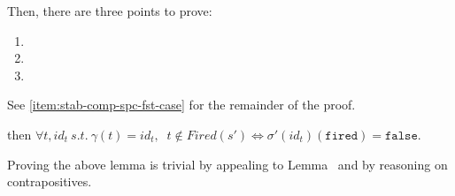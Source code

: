 \documentclass[dvipsnames,12pt]{article}
\begin{document}
\begin{niproof}
\begin{enumerate}
\begin{enumerate}
\begin{enumerate}
        Then, there are three points to prove:
        \begin{enumerate}
        \item {}
        \item {}
        \item
        \end{enumerate}
        
        See \ref{item:stab-comp-spc-fst-case} for the remainder of the
        proof.
        
      \end{enumerate}
      
    \end{enumerate}
  \end{enumerate}
  
\end{niproof}


\begin{lemma}
  \label{lem:fe-equal-not-fired}
  \fehyps{} then $\forall{}t,id_t~s.t.~\gamma(t)=id_t,$
  $~t\notin{}Fired(s')\Leftrightarrow\sigma'(id_t)(\texttt{fired})=\mathtt{false}$.
\end{lemma}

\begin{niproof}
  Proving the above lemma is trivial by appealing to
  Lemma~ and by reasoning on
  contrapositives.
\end{niproof}



% 
% 
% 


\printbibliography[heading=bibintoc]
\end{document}
